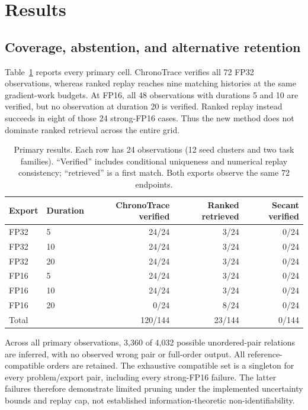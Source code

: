 \section{Results}
\subsection{Coverage, abstention, and alternative retention}
Table~\ref{tab:coverage} reports every primary cell. ChronoTrace verifies all 72 FP32 observations, whereas ranked replay reaches nine matching histories at the same gradient-work budgets. At FP16, all 48 observations with durations 5 and 10 are verified, but no observation at duration 20 is verified. Ranked replay instead succeeds in eight of those 24 strong-FP16 cases. Thus the new method does not dominate ranked retrieval across the entire grid.

\begin{table}[t]
\centering
\caption{Primary results. Each row has 24 observations (12 seed clusters and two task families). ``Verified'' includes conditional uniqueness and numerical replay consistency; ``retrieved'' is a first match. Both exports observe the same 72 endpoints.}\label{tab:coverage}
\begin{tabular}{llrrr}
\toprule
Export & Duration & ChronoTrace verified & Ranked retrieved & Secant verified\\
\midrule
FP32 & 5 & 24/24 & 3/24 & 0/24\\
FP32 & 10 & 24/24 & 3/24 & 0/24\\
FP32 & 20 & 24/24 & 3/24 & 0/24\\
FP16 & 5 & 24/24 & 3/24 & 0/24\\
FP16 & 10 & 24/24 & 3/24 & 0/24\\
FP16 & 20 & 0/24 & 8/24 & 0/24\\
\midrule
Total & & 120/144 & 23/144 & 0/144\\
\bottomrule
\end{tabular}
\end{table}
Across all primary observations, 3,360 of 4,032 possible unordered-pair relations are inferred, with no observed wrong pair or full-order output. All reference-compatible orders are retained. The exhaustive compatible set is a singleton for every problem/export pair, including every strong-FP16 failure. The latter failures therefore demonstrate limited pruning under the implemented uncertainty bounds and replay cap, not established information-theoretic non-identifiability.

